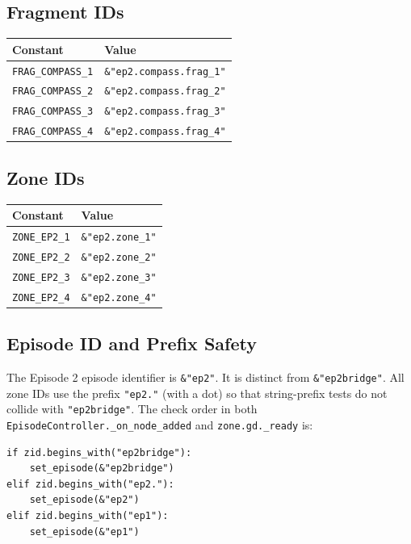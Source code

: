 \documentclass[12pt, a4paper]{article}
\begin{document}
\subsection{Fragment IDs}

\begin{center}
\begin{tabular}{ll}
\toprule
\textbf{Constant} & \textbf{Value} \\
\midrule
\texttt{FRAG\_COMPASS\_1} & \texttt{\&"ep2.compass.frag\_1"} \\
\texttt{FRAG\_COMPASS\_2} & \texttt{\&"ep2.compass.frag\_2"} \\
\texttt{FRAG\_COMPASS\_3} & \texttt{\&"ep2.compass.frag\_3"} \\
\texttt{FRAG\_COMPASS\_4} & \texttt{\&"ep2.compass.frag\_4"} \\
\bottomrule
\end{tabular}
\end{center}

\subsection{Zone IDs}

\begin{center}
\begin{tabular}{ll}
\toprule
\textbf{Constant} & \textbf{Value} \\
\midrule
\texttt{ZONE\_EP2\_1} & \texttt{\&"ep2.zone\_1"} \\
\texttt{ZONE\_EP2\_2} & \texttt{\&"ep2.zone\_2"} \\
\texttt{ZONE\_EP2\_3} & \texttt{\&"ep2.zone\_3"} \\
\texttt{ZONE\_EP2\_4} & \texttt{\&"ep2.zone\_4"} \\
\bottomrule
\end{tabular}
\end{center}

\subsection{Episode ID and Prefix Safety}

The Episode 2 episode identifier is \texttt{\&"ep2"}. It is distinct from
\texttt{\&"ep2bridge"}. All zone IDs use the prefix \texttt{"ep2."} (with a
dot) so that string-prefix tests do not collide with \texttt{"ep2bridge"}.
The check order in both \texttt{EpisodeController.\_on\_node\_added} and
\texttt{zone.gd.\_ready} is:

\begin{lstlisting}
if zid.begins_with("ep2bridge"):
    set_episode(&"ep2bridge")
elif zid.begins_with("ep2."):
    set_episode(&"ep2")
elif zid.begins_with("ep1"):
    set_episode(&"ep1")
\end{lstlisting}
\end{document}
